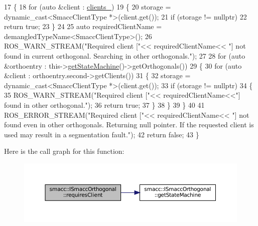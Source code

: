 \begin{DoxyCode}
17 \{
18     \textcolor{keywordflow}{for} (\textcolor{keyword}{auto} &client : \hyperlink{classsmacc_1_1ISmaccOrthogonal_a0f270e9c8c126198f6bce542ab4e04ba}{clients\_})
19     \{
20         storage = \textcolor{keyword}{dynamic\_cast<}SmaccClientType *\textcolor{keyword}{>}(client.get());
21         \textcolor{keywordflow}{if} (storage != \textcolor{keyword}{nullptr})
22             \textcolor{keywordflow}{return} \textcolor{keyword}{true};
23     \}
24 
25     \textcolor{keyword}{auto} requiredClientName = demangledTypeName<SmaccClientType>();
26     ROS\_WARN\_STREAM(\textcolor{stringliteral}{"Required client ["}<< requiredClientName<< \textcolor{stringliteral}{"] not found in current orthogonal.
       Searching in other orthogonals."});
27 
28     \textcolor{keywordflow}{for} (\textcolor{keyword}{auto} &orthoentry : this->\hyperlink{classsmacc_1_1ISmaccOrthogonal_aae265ec480b8ed552ddc79afd2d93a62}{getStateMachine}()->getOrthogonals())
29     \{
30         \textcolor{keywordflow}{for} (\textcolor{keyword}{auto} &client : orthoentry.second->getClients())
31         \{
32             storage = \textcolor{keyword}{dynamic\_cast<}SmaccClientType *\textcolor{keyword}{>}(client.get());
33             \textcolor{keywordflow}{if} (storage != \textcolor{keyword}{nullptr})
34             \{
35                 ROS\_WARN\_STREAM(\textcolor{stringliteral}{"Required client  ["}<< requiredClientName<<\textcolor{stringliteral}{"] found in other orthogonal."});
36                 \textcolor{keywordflow}{return} \textcolor{keyword}{true};
37             \}
38         \}
39     \}
40 
41     ROS\_ERROR\_STREAM(\textcolor{stringliteral}{"Required client ["}<< requiredClientName<< \textcolor{stringliteral}{"] not found even in other orthogonals.
       Returning null pointer. If the requested client is used may result in a segmentation fault."});
42     \textcolor{keywordflow}{return} \textcolor{keyword}{false};
43 \}
\end{DoxyCode}
Here is the call graph for this function\+:
\nopagebreak
\begin{figure}[H]
\begin{center}
\leavevmode
\includegraphics[width=350pt]{classsmacc_1_1ISmaccOrthogonal_a602e16b09f8a1b3de889f2f3d90a3211_cgraph}
\end{center}
\end{figure}
